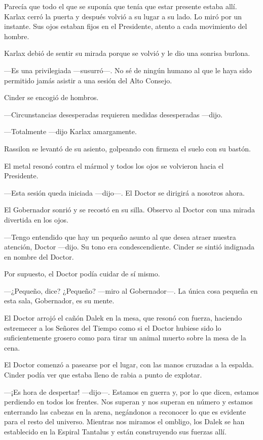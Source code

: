 Parecía que todo el que se suponía que tenía que estar presente estaba allí. Karlax cerró la puerta y después volvió a su lugar a su lado. Lo miró por un instante. Sus ojos estaban fijos en el Presidente, atento a cada movimiento del hombre.

Karlax debió de sentir su mirada porque se volvió y le dio una sonrisa burlona. 

—Es una privilegiada —susurró—.  No sé de ningún humano al que le haya sido permitido jamás asistir a una sesión del Alto Consejo.

Cinder se encogió de hombros. 

—Circunstancias desesperadas requieren medidas desesperadas —dijo.

—Totalmente —dijo Karlax amargamente.

Rassilon se levantó de su asiento, golpeando con firmeza el suelo con su bastón.

El metal resonó contra el mármol y todos los ojos se volvieron hacia el Presidente. 

—Esta sesión queda iniciada —dijo—. El Doctor se dirigirá a nosotros ahora.

El Gobernador sonrió y se recostó en su silla. Observo al Doctor con una mirada divertida en los ojos. 

—Tengo entendido que hay un pequeño asunto al que desea atraer nuestra atención, Doctor —dijo. Su tono era condescendiente. Cinder se sintió indignada en nombre del Doctor.

Por supuesto, el Doctor podía cuidar de sí mismo. 

—¿Pequeño, dice? ¿Pequeño? —miro al Gobernador—. La única cosa pequeña en esta sala, Gobernador, es su mente.

El Doctor arrojó el cañón Dalek en la mesa, que resonó con fuerza, haciendo estremecer a los Señores del Tiempo como si el Doctor hubiese sido lo suficientemente grosero como para tirar un animal muerto sobre la mesa de la cena.

El Doctor comenzó a pasearse por el lugar, con las manos cruzadas a la espalda. Cinder podía ver que estaba lleno de rabia a punto de explotar. 

—¡Es hora de despertar! —dijo—. Estamos en guerra y, por lo que dicen, estamos perdiendo en todos los frentes. Nos superan y nos superan en número y estamos enterrando las cabezas en la arena, negándonos a reconocer lo que es evidente para el resto del universo. Mientras nos miramos el ombligo, los Dalek se han establecido en la Espiral Tantalus y están construyendo sus fuerzas allí.

